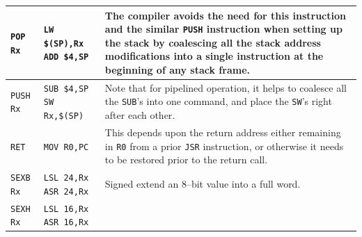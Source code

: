 \documentclass{gqtekspec}
\begin{document}
\begin{table}\begin{center}
\begin{tabular}{p{1.0in}p{1.5in}p{3.2in}}\\\hline
{\tt POP Rx }
	& \parbox[t]{1.5in}{\tt LW \$(SP),Rx \\ ADD \$4,SP}
	& The compiler avoids the need for this instruction and the similar
	{\tt PUSH} instruction when setting up the stack by coalescing all
	the stack address modifications into a single instruction at the
	beginning of any stack frame.\\\hline
{\tt PUSH Rx}
	& \parbox[t]{1.5in}{\hbox{\tt SUB \$4,SP} 
	\hbox{\tt SW Rx,\$(SP)}}
	& Note that for pipelined operation, it helps to coalesce all the
	{\tt SUB}'s into one command, and place the {\tt SW}'s right
	after each other.
	\\\hline
%
{\tt RET} & {\tt MOV R0,PC}
	& This depends upon the return address either remaining in {\tt R0}
	from a prior {\tt JSR} instruction, or otherwise it needs to be
	restored prior to the return call.  \\\hline
{\tt SEXB Rx }
	& \parbox[t]{1.5in}{\tt LSL 24,Rx \\ ASR 24,Rx}
	& Signed extend an 8--bit value into a full word.\\\hline
{\tt SEXH Rx }	
	& \parbox[t]{1.5in}{\tt LSL 16,Rx \\ ASR 16,Rx}

\end{tabular}
\end{center}
\end{table}
\end{document}
